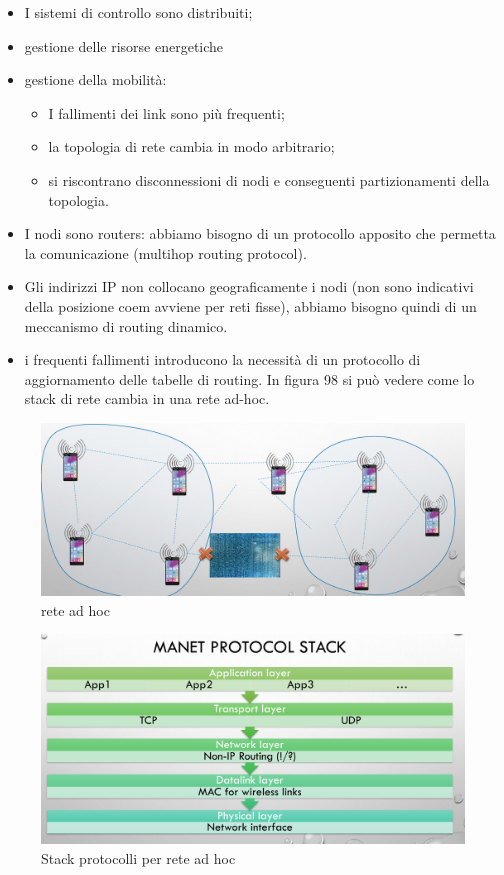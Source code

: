 \documentclass[12pt]{article}
\begin{document}
			\begin{itemize}
				\item I sistemi di controllo sono distribuiti;
				\item gestione delle risorse energetiche
				\item gestione della mobilità:
				\begin{itemize}
					\item I fallimenti dei link sono più frequenti;
					\item la topologia di rete cambia in modo arbitrario;
					\item si riscontrano disconnessioni di nodi e conseguenti partizionamenti della topologia.
				\end{itemize}
				\item I nodi sono routers: abbiamo bisogno di un protocollo apposito che permetta la comunicazione (multihop routing protocol).
				\item Gli indirizzi IP non collocano geograficamente i nodi (non sono indicativi della posizione coem avviene per reti fisse), abbiamo bisogno quindi di un meccanismo di routing dinamico.
				\item i frequenti fallimenti introducono la necessità di un protocollo di aggiornamento delle tabelle di routing. In figura 98 si può vedere come lo stack di rete cambia in una rete ad-hoc.
			\end{itemize}
			\begin{figure}[h!]
				\centering
				\includegraphics[scale=0.3]{img/adhocs.png}
				\caption{rete ad hoc}
			\end{figure}
			\begin{figure}[h!]
				\centering
				\includegraphics[scale=0.3]{img/manet.png}
				\caption{Stack protocolli per rete ad hoc}
			\end{figure}
\end{document}

